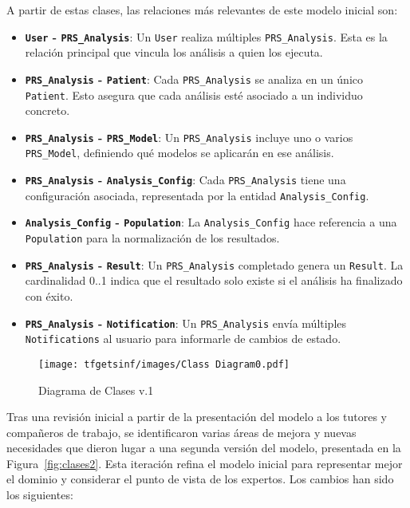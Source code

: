 A partir de estas clases, las relaciones más relevantes de este modelo inicial son:
\begin{itemize}
    \item \textbf{\texttt{User} - \texttt{PRS\_Analysis}}: Un \texttt{User} realiza múltiples \texttt{PRS\_Analysis}. Esta es la relación principal que vincula los análisis a quien los ejecuta.
    
    \item \textbf{\texttt{PRS\_Analysis} - \texttt{Patient}}: Cada \texttt{PRS\_Analysis} se analiza en un único \texttt{Patient}. Esto asegura que cada análisis esté asociado a un individuo concreto.
    
    \item \textbf{\texttt{PRS\_Analysis} - \texttt{PRS\_Model}}: Un \texttt{PRS\_Analysis} incluye uno o varios \texttt{PRS\_Model}, definiendo qué modelos se aplicarán en ese análisis.
    
    \item \textbf{\texttt{PRS\_Analysis} - \texttt{Analysis\_Config}}: Cada \texttt{PRS\_Analysis} tiene una configuración asociada, representada por la entidad \texttt{Analysis\_Config}.
    
    \item \textbf{\texttt{Analysis\_Config} - \texttt{Population}}: La \texttt{Analysis\_Config} hace referencia a una \texttt{Population} para la normalización de los resultados.
    
    \item \textbf{\texttt{PRS\_Analysis} - \texttt{Result}}: Un \texttt{PRS\_Analysis} completado genera un \texttt{Result}. La cardinalidad 0..1 indica que el resultado solo existe si el análisis ha finalizado con éxito.
    
    \item \textbf{\texttt{PRS\_Analysis} - \texttt{Notification}}: Un \texttt{PRS\_Analysis} envía múltiples \texttt{Notifications} al usuario para informarle de cambios de estado.
\end{itemize}

\begin{figure}[H]
    \centering
    \texttt{[image: tfgetsinf/images/Class Diagram0.pdf]}
    \caption{Diagrama de Clases v.1}
    \label{fig:clases1}
\end{figure}

Tras una revisión inicial a partir de la presentación del modelo a los tutores y compañeros de trabajo, se identificaron varias áreas de mejora y nuevas necesidades que dieron lugar a una segunda versión del modelo, presentada en la Figura~\ref{fig:clases2}. Esta iteración refina el modelo inicial para representar mejor el dominio y considerar el punto de vista de los expertos. Los cambios han sido los siguientes: 

